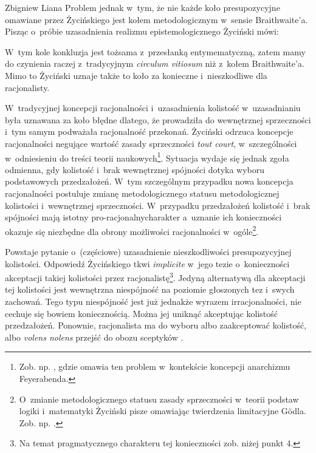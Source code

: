 \begin{artplenv}{Zbigniew Liana}
Problem jednak w~tym, że nie każde koło presupozycyjne omawiane przez Życińskiego jest kołem metodologicznym w~sensie Braithwaite'a. Pisząc o~próbie uzasadnienia realizmu epistemologicznego Życiński mówi:

W~tym kole konkluzja jest tożsama z~przesłanką entymematyczną, zatem mamy do czynienia raczej z~tradycyjnym \textit{circulum vitiosum} niż z~kołem Braithwaite'a. Mimo to Życiński uznaje także to koło za konieczne i~nieszkodliwe dla racjonalisty.

W~tradycyjnej koncepcji racjonalności i~uzasadnienia kolistość w~uzasadnianiu była uznawana za koło błędne dlatego, że prowadziła do wewnętrznej sprzeczności i~tym samym podważała racjonalność przekonań. Życiński odrzuca koncepcje racjonalności negujące wartość zasady sprzeczności \textit{tout court}, w~szczególności w~odniesieniu do treści teorii naukowych\footnote{Zob. np.
\parencites[][s.~218n]{zycinski_elementy_1996}[][s.~297n]{zycinski_elementy_2015}, %
 gdzie omawia ten problem w~kontekście koncepcji anarchizmu Feyerabenda.}. Sytuacja wydaje się jednak zgoła odmienna, gdy kolistość i~brak wewnętrznej spójności dotyka wyboru podstawowych przedzałożeń. W~tym szczególnym przypadku nowa koncepcja racjonalności postuluje zmianę metodologicznego statusu metodologicznej kolistości i~wewnętrznej sprzeczności. W~przypadku przedzałożeń kolistość i~brak spójności mają istotny pro-racjonalnycharakter a~uznanie ich konieczności okazuje się niezbędne dla obrony możliwości racjonalności w~ogóle\footnote{O~zmianie metodologicznego statusu zasady sprzeczności w~teorii podstaw logiki i~matematyki Życiński pisze omawiając twierdzenia limitacyjne Gödla. Zob. np. 
\parencites[][s.~196]{zycinski_teizm_1985}[][s.~131n]{zycinski_structure_1988}[][.~231nn]{zycinski_struktura_2013_liana}[][s.~266n]{zycinski_elementy_1996}[][s.~360nn]{zycinski_elementy_2015}.%
}.

Powstaje pytanie o~(częściowe) uzasadnienie nieszkodliwości presupozycyjnej kolistości. Odpowiedź Życińskiego tkwi \textit{implicite} w~jego tezie o~konieczności akceptacji takiej kolistości przez racjonalistę\footnote{Na temat pragmatycznego charakteru tej konieczności zob. niżej punkt 4.}. Jedyną alternatywą dla akceptacji tej kolistości jest wewnętrzna niespójność na poziomie głoszonych tez i~swych zachowań. Tego typu niespójność jest już jednakże wyrazem irracjonalności, nie cechuje się bowiem koniecznością. Można jej uniknąć akceptując kolistość przedzałożeń. Ponownie, racjonalista ma do wyboru albo zaakceptować kolistość, albo \textit{volens nolens} przejść do obozu sceptyków
\parencite[][s.~165]{zycinski_teizm_1985}.%



\end{artplenv}
